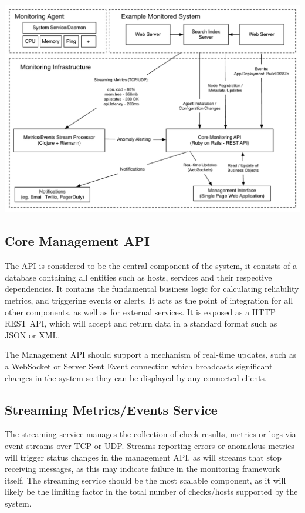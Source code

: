 \documentclass{cshonours}
\begin{document}
\begin{listing}[h]
  \centerline{
    \includegraphics[scale=0.6]{architecture.pdf}
  }
\end{listing}

\subsection{Core Management API}

The API is considered to be the central component of the system, it consists of a database containing all entities such as hosts, services and their respective dependencies. It contains the fundamental business logic for calculating reliability metrics, and triggering events or alerts. It acts as the point of integration for all other components, as well as for external services. It is exposed as a HTTP REST API, which will accept and return data in a standard format such as JSON or XML.

The Management API should support a mechanism of real-time updates, such as a WebSocket or Server Sent Event connection which broadcasts significant changes in the system so they can be displayed by any connected clients.

\subsection{Streaming Metrics/Events Service}

The streaming service manages the collection of check results, metrics or logs via event streams over TCP or UDP. Streams reporting errors or anomalous metrics will trigger status changes in the management API, as will streams that stop receiving messages, as this may indicate failure in the monitoring framework itself. The streaming service should be the most scalable component, as it will likely be the limiting factor in the total number of checks/hosts supported by the system.
\end{document}

